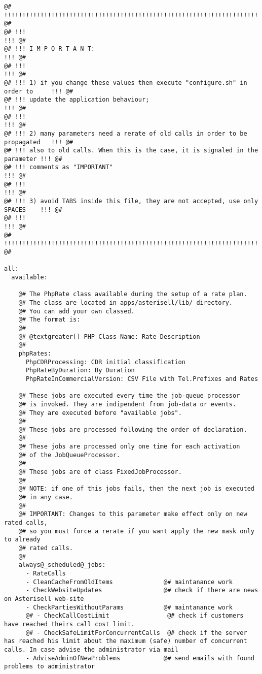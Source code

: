 \documentclass[letterpaper,10pt,english]{sphinxmanual}
\begin{document}
\begin{Verbatim}[commandchars=@\[\]]
@# !!!!!!!!!!!!!!!!!!!!!!!!!!!!!!!!!!!!!!!!!!!!!!!!!!!!!!!!!!!!!!!!!!!!!!!!!!!!!!!!! @#
@# !!!                                                                           !!! @#
@# !!! I M P O R T A N T:                                                        !!! @#
@# !!!                                                                           !!! @#
@# !!! 1) if you change these values then execute "configure.sh" in order to     !!! @#
@# !!! update the application behaviour;                                         !!! @#
@# !!!                                                                           !!! @#
@# !!! 2) many parameters need a rerate of old calls in order to be propagated   !!! @#
@# !!! also to old calls. When this is the case, it is signaled in the parameter !!! @# 
@# !!! comments as "IMPORTANT"                                                   !!! @#
@# !!!                                                                           !!! @#
@# !!! 3) avoid TABS inside this file, they are not accepted, use only SPACES    !!! @#
@# !!!                                                                           !!! @#
@# !!!!!!!!!!!!!!!!!!!!!!!!!!!!!!!!!!!!!!!!!!!!!!!!!!!!!!!!!!!!!!!!!!!!!!!!!!!!!!!!! @#

all:
  available:

    @# The PhpRate class available during the setup of a rate plan.
    @# The class are located in apps/asterisell/lib/ directory.
    @# You can add your own classed.
    @# The format is: 
    @#
    @# @textgreater[] PHP-Class-Name: Rate Description
    @#
    phpRates: 
      PhpCDRProcessing: CDR initial classification
      PhpRateByDuration: By Duration
      PhpRateInCommercialVersion: CSV File with Tel.Prefixes and Rates

    @# These jobs are executed every time the job-queue processor
    @# is invoked. They are indipendent from job-data or events.
    @# They are executed before "available jobs".
    @#
    @# These jobs are processed following the order of declaration.
    @#
    @# These jobs are processed only one time for each activation
    @# of the JobQueueProcessor.
    @#
    @# These jobs are of class FixedJobProcessor.
    @#
    @# NOTE: if one of this jobs fails, then the next job is executed 
    @# in any case.
    @#
    @# IMPORTANT: Changes to this parameter make effect only on new rated calls,
    @# so you must force a rerate if you want apply the new mask only to already
    @# rated calls.
    @#
    always@_scheduled@_jobs:
      - RateCalls
      - CleanCacheFromOldItems              @# maintanance work
      - CheckWebsiteUpdates                 @# check if there are news on Asterisell web-site
      - CheckPartiesWithoutParams           @# maintanance work
      @# - CheckCallCostLimit                @# check if customers have reached theirs call cost limit.
      @# - CheckSafeLimitForConcurrentCalls  @# check if the server has reached his limit about the maximum (safe) number of concurrent calls. In case advise the administrator via mail
      - AdviseAdminOfNewProblems            @# send emails with found problems to administrator



\end{Verbatim}
\end{document}
